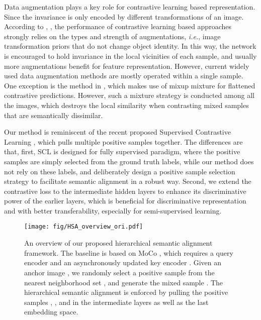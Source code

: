 \documentclass[10pt,twocolumn,letterpaper]{article}
\begin{document}
Data augmentation plays a key role for contrastive learning based representation. Since the invariance is only encoded by different transformations of an image. According to \cite{chen2020simple}, \cite{tian2020makes}, the performance of contrastive learning based approaches strongly relies on the types and strength of augmentations, \emph{i.e.}, image transformation priors that do not change object identity. In this way, the network is encouraged to hold invariance in the local vicinities of each sample, and usually more augmentations benefit for feature representation. However, current widely used data augmentation methods are mostly operated within a single sample. One exception is the method in \cite{shen2020rethinking}, which makes use of mixup mixture for flattened contrastive predictions. However, such a mixture strategy is conducted among all the images, which destroys the local similarity when contrasting mixed samples that are semantically dissimilar.

Our method is reminiscent of the recent proposed Supervised Contrastive Learning \cite{khosla2020supervised}, which pulls multiple positive samples together. The differences are that, first, SCL is designed for fully supervised paradigm, where the positive samples are simply selected from the ground truth labels, while our method does not rely on these labels, and deliberately design a positive sample selection strategy to facilitate semantic alignment in a robust way. Second, we extend the contrastive loss to the intermediate hidden layers to enhance its discriminative power of the earlier layers, which is beneficial for discriminative representation and with better transferability, especially for semi-supervised learning.



\begin{figure*}[t!]
  \begin{center}
        \texttt{[image: fig/HSA\_overview\_ori.pdf]}
  \end{center}
  \vspace{-0.3cm}
     \caption{An overview of our proposed hierarchical semantic alignment framework. The baseline is based on MoCo \cite{he2020momentum}, which requires a query encoder  and an asynchronously updated key encoder . Given an anchor image , we randomly select a positive sample  from the nearest neighborhood set , and generate the mixed sample . The hierarchical semantic alignment is enforced by pulling the positive samples , , and  in the intermediate layers as well as the last embedding space.}
  \label{framework}
\end{figure*}
\end{document}
